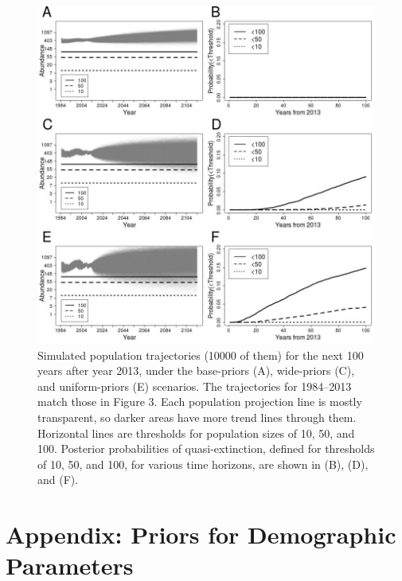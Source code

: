 \documentclass[12pt, titlepage]{article}\usepackage[]{graphicx}\usepackage[]{color}
\renewcommand{\thetable}{\Roman{table}}
\begin{document}
\begin{figure}[H]
  \begin{center}
  \includegraphics[width=0.85\linewidth]{figure/plot-PVA-1.jpeg}
  \end{center}
  \caption{Simulated population trajectories (10000 of them) for the next 100 years after year 2013, under the base-priors (A), wide-priors (C), and uniform-priors (E) scenarios. The trajectories for 1984--2013 match those in Figure 3. Each population projection line is mostly transparent, so darker areas have more trend lines through them.   Horizontal lines are thresholds for population sizes of 10, 50, and 100.  Posterior probabilities of quasi-extinction, defined for thresholds of 10, 50, and 100, for various time horizons, are shown in (B), (D), and (F). \label{plot-PVA}}         
\end{figure}


\clearpage
\setcounter{equation}{0}
\setcounter{table}{0}
\renewcommand{\theequation}{A.\arabic{equation}}
\renewcommand{\thetable}{A.\arabic{table}}

\section*{Appendix: Priors for Demographic Parameters}
\end{document}
